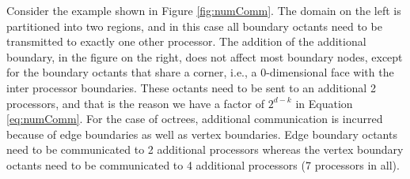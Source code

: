 Consider the example shown in Figure \ref{fig:numComm}. The domain on
the left is partitioned into two regions, and in this case all
boundary octants need to be transmitted to exactly one other
processor. The addition of the additional boundary, in the figure on
the right, does not affect most boundary nodes, except for the
boundary octants that share a corner, i.e., a 0-dimensional face with
the inter processor boundaries. These octants need to be sent to an
additional 2 processors, and that is the reason we have a factor of
$2^{d-k}$ in Equation \ref{eq:numComm}. For the case of octrees,
additional communication is incurred because of edge boundaries as
well as vertex boundaries. Edge boundary octants need to be
communicated to 2 additional processors whereas the vertex boundary
octants need to be communicated to 4 additional processors (7
processors in all).

